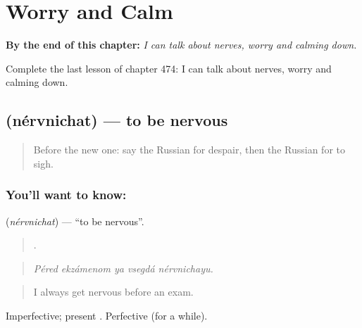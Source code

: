 
\chapter{Worry and Calm}
\label{ch:ru-worry-and-calm}

\begin{chapteropening}
\textbf{By the end of this chapter:} \emph{I can talk about nerves, worry and calming down.}

Complete the last lesson of chapter 474: I can talk about nerves, worry and calming down.
\end{chapteropening}

\section[\texorpdfstring{\ru{нервничать} (nérvnichat)}{нервничать (nérvnichat)}]{ (nérvnichat) — to be nervous}

\label{lesson:RU-C474-nervnichat}



\begin{quote}
Before the new one: say the Russian for despair, then the Russian for to sigh.
\end{quote}

\subsection*{You'll want to know: }
\textbf{} (\emph{nérvnichat}) — \textquotedblleft{}to be nervous\textquotedblright{}.

\begin{quote}
    .
\end{quote}

\begin{quote}
\emph{Péred ekzámenom ya vsegdá nérvnichayu.}
\end{quote}

\begin{quote}
I always get nervous before an exam.
\end{quote}

Imperfective; present . Perfective  (for a while).

